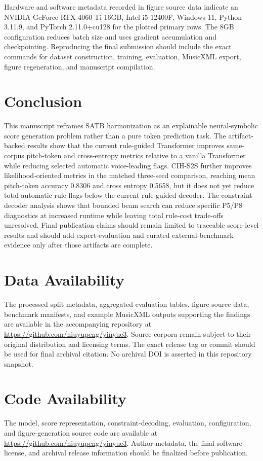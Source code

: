 \documentclass[11pt]{article}
\begin{document}
Hardware and software metadata recorded in figure source data indicate an NVIDIA GeForce RTX 4060 Ti 16GB, Intel i5-12400F, Windows 11, Python 3.11.9, and PyTorch 2.11.0+cu128 for the plotted primary rows. The 8GB configuration reduces batch size and uses gradient accumulation and checkpointing. Reproducing the final submission should include the exact commands for dataset construction, training, evaluation, MusicXML export, figure regeneration, and manuscript compilation.

\section{Conclusion}

This manuscript reframes SATB harmonization as an explainable neural-symbolic score generation problem rather than a pure token prediction task. The artifact-backed results show that the current rule-guided Transformer improves same-corpus pitch-token and cross-entropy metrics relative to a vanilla Transformer while reducing selected automatic voice-leading flags. CIH-S2S further improves likelihood-oriented metrics in the matched three-seed comparison, reaching mean pitch-token accuracy 0.8306 and cross entropy 0.5658, but it does not yet reduce total automatic rule flags below the current rule-guided decoder. The constraint-decoder analysis shows that bounded beam search can reduce specific P5/P8 diagnostics at increased runtime while leaving total rule-cost trade-offs unresolved. Final publication claims should remain limited to traceable score-level results and should add expert-evaluation and curated external-benchmark evidence only after those artifacts are complete.

\section*{Data Availability}

The processed split metadata, aggregated evaluation tables, figure source data, benchmark manifests, and example MusicXML outputs supporting the findings are available in the accompanying repository at \url{https://github.com/niuyupeng/yinyue3}. Source corpora remain subject to their original distribution and licensing terms. The exact release tag or commit should be used for final archival citation. No archival DOI is asserted in this repository snapshot.

\section*{Code Availability}

The model, score representation, constraint-decoding, evaluation, configuration, and figure-generation source code are available at \url{https://github.com/niuyupeng/yinyue3}. Author metadata, the final software license, and archival release information should be finalized before publication.



\end{document}
